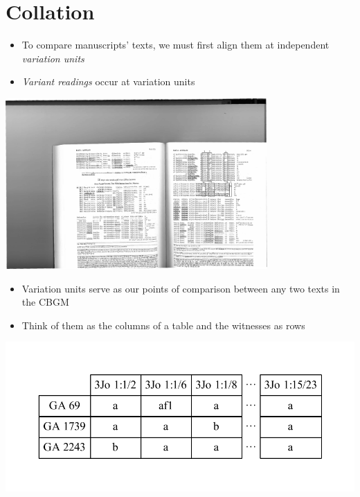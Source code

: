 \documentclass[10pt]{beamer}
\begin{document}
	\section*{Collation}
	\begin{frame}
		\begin{itemize}
			\item To compare manuscripts' texts, we must first align them at independent \emph{variation units}
			\item \emph{Variant readings} occur at variation units
		\end{itemize}
		\begin{center}
			\includegraphics[width=0.75\textwidth]{../img/swanson-luke-10-2-variation-units.pdf}
		\end{center}
		\footnotesize\parencite[Source:][183]{Swanson.Luke}
	\end{frame}
	\begin{frame}
		\begin{itemize}
			\item Variation units serve as our points of comparison between any two texts in the CBGM
			\item Think of them as the columns of a table and the witnesses as rows
		\end{itemize}
		\begin{center}
			\includegraphics[scale=0.5]{../img/witnesses.pdf}
		\end{center}
	\end{frame}
\end{document}
